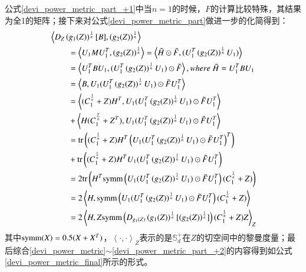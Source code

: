 公式\ref{devi_power_metric_part_+1}中当$n=1$的时候，$F$的计算比较特殊，其结果为全1的矩阵；接下来对公式\ref{devi_power_metric_part}做进一步的化简得到：
\begin{equation}
\label{devi_power_metric_part_+2}
\begin{split}
&\left<D_{Z}\left(g_{1}(Z)\right)^{\frac{1}{n}}[B],\left(g_{2}(Z)\right)^{\frac{1}{n}}\right>\\
&~~~~~~~~~=\left<U_{1}MU_{1}^{T},\left(g_{2}(Z)\right)^{\frac{1}{n}}\right>=\left<\tilde{H}\odot\tilde{F},(U_{1}^{T}\left(g_{2}(Z)\right)^{\frac{1}{n}}U_{1})\right>\\
&~~~~~~~~~=\left<U_{1}^{T}BU_{1},(U_{1}^{T}\left(g_{2}(Z)\right)^{\frac{1}{n}}U_{1})\odot\tilde{F}\right>,where~\tilde{H}=U_{1}^{T}BU_{1}\\
&~~~~~~~~~=\left<B,U_{1}(U_{1}^{T}\left(g_{2}(Z)\right)^{\frac{1}{n}}U_{1})\odot\tilde{F}U_{1}^{T}\right>\\
&~~~~~~~~~=\left<(C_{1}^{\frac{1}{n}}+Z)H^{T},U_{1}(U_{1}^{T}\left(g_{2}(Z)\right)^{\frac{1}{n}}U_{1})\odot\tilde{F}U_{1}^{T}\right>\\
&~~~~~~~~~+\left<H(C_{1}^{\frac{T}{n}}+Z^{T}),U_{1}(U_{1}^{T}\left(g_{2}(Z)\right)^{\frac{1}{n}}U_{1})\odot\tilde{F}U_{1}^{T}\right>\\
&~~~~~~~~~={\rm tr}\left((C_{1}^{\frac{1}{n}}+Z)H^{T}\left(U_{1}(U_{1}^{T}\left(g_{2}(Z)\right)^{\frac{1}{n}}U_{1})\odot\tilde{F}U_{1}^{T}\right)^{T}\right)\\
&~~~~~~~~~+{\rm tr}\left((C_{1}^{\frac{1}{n}}+Z)H^{T}U_{1}(U_{1}^{T}\left(g_{2}(Z)\right)^{\frac{1}{n}}U_{1})\odot\tilde{F}U_{1}^{T}\right)\\
&~~~~~~~~~=2{\rm tr}\left(H^{T}{\rm symm}\left(U_{1}(U_{1}^{T}\left(g_{2}(Z)\right)^{\frac{1}{n}}U_{1})\odot\tilde{F}U_{1}^{T}\right)(C_{1}^{\frac{1}{n}}+Z)\right)\\
&~~~~~~~~~=2\left<H,{\rm symm}\left(U_{1}(U_{1}^{T}\left(g_{2}(Z)\right)^{\frac{1}{n}}U_{1})\odot\tilde{F}U_{1}^{T}\right)(C_{1}^{\frac{1}{n}}+Z)\right>\\
&~~~~~~~~~=2\left<H,Z{\rm symm}\left(D_{g_{1}(Z)}\left(g_{1}(Z)\right)^{\frac{1}{n}}[\left(g_{2}(Z)\right)^{\frac{1}{n}}]\right)(C_{1}^{\frac{1}{n}}+Z)Z\right>_Z\\
\end{split}
\end{equation}
其中${\rm symm}(X)=0.5(X+X^{T})$，$\left<\cdot,\cdot\right>_Z$表示的是$\mathbb{S}_{d}^{+}$在$Z$的切空间中的黎曼度量；最后综合\ref{devi_power_metric}$\sim$\ref{devi_power_metric_part_+2}的内容得到如公式\ref{devi_power_metric_final}所示的形式。
